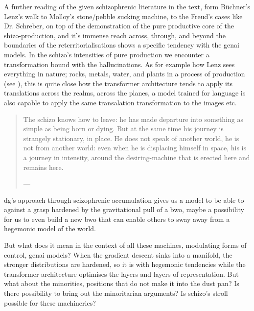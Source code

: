 \begin{orangebox}
	A further reading of the given schizophrenic literature in the text, form
	Büchner's Lenz's walk to Molloy's stone/pebble sucking machine, to the Freud's
	cases like Dr. Schreber, on top of the demonstration of the pure productive
	core of the shizo-production, and it's immense reach across, through, and
	beyond the boundaries of the reterritorialisations shows a specific tendency
	with the \gls{genai} models. In the schizo's intensities of pure production we
	encounter a transformation bound with the hallucinations. As for example how Lenz sees everything in nature; rocks, metals, water, and plants in a process of production (see \cite[41]{buchanan2008b}), this is quite close how the transformer architecture tends to apply its translations across the realms, across the planes, a model trained for language is also capable to apply the same transalation transformation to the images etc.
\end{orangebox}




\begin{quote}
	The schizo knows how to leave: he has made departure into something as simple as being born or dying. But at the same time his journey is strangely stationary, in place. He does not speak of another world, he is not from another world: even when he is displacing himself in space, his is a journey in intensity, around the desiring-machine that is erected here and remains here.

	— \cite[131]{deleuze1983}
\end{quote}


\begin{redbox}

	\gls{dg}'s approach through scizophrenic accumulation gives us a model to be
	able to against a grasp hardened by the gravitational pull of a \gls{bwo},
	maybe a possibility for us to even build a new \gls{bwo} that can enable others
	to sway away from a hegemonic model of the world.

	But what does it mean in the
	context of all these machines, modulating forms of control, \gls{genai} models? When the gradient descent sinks into a manifold, the stronger distributions are hardened, so it is with hegemonic tendencies while the transformer architecture optimises the layers and layers of representation. But what about the minorities, positions that do not make it into the dust pan? Is there possibility to bring out the minoritarian arguments? Is schizo's stroll possible for these machineries?

\end{redbox}


